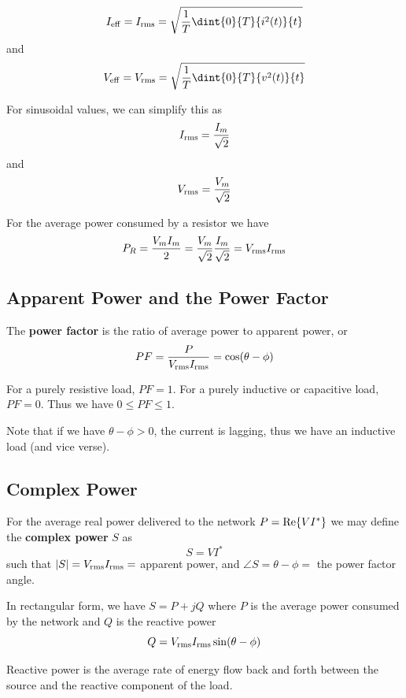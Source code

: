 \documentclass[12pt]{article}
\begin{document}
\[ I_{{\rm eff}} = I_{{\rm rms}} = \sqrt{\frac{1}{T}\dint{0}{T}{i^2(t)}{t}} \] and \[ V_{{\rm eff}} = V_{{\rm rms}} = \sqrt{\frac{1}{T}\dint{0}{T}{v^2(t)}{t}} \]

For sinusoidal values, we can simplify this as \[ I_{{\rm rms}} = \frac{I_m}{\sqrt{2}} \] and \[ V_{{\rm rms}} = \frac{V_m}{\sqrt{2}} \]

For the average power consumed by a resistor we have \[ P_R = \frac{V_mI_m}{2} = \frac{V_m}{\sqrt{2}}\frac{I_m}{\sqrt{2}} = V_{{\rm rms}}I_{{\rm rms}} \]

\subsection*{Apparent Power and the Power Factor}
The {\bf power factor} is the ratio of average power to apparent power, or \[ PF = \frac{P}{V_{{\rm rms}}I_{{\rm rms}}} = \cos(\theta - \phi) \]

For a purely resistive load, $PF = 1$. For a purely inductive or capacitive load, $PF = 0$. Thus we have $0 \leq PF \leq 1$.

Note that if we have $\theta - \phi > 0$, the current is lagging, thus we have an inductive load (and vice verse).

\subsection*{Complex Power}
For the average real power delivered to the network $P = {\rm Re}\{VI^*\}$ we may define the {\bf complex power} $S$ as \[ S = VI^* \] such that $|S| = V_{{\rm rms}}I_{{\rm rms}} =$ apparent power, and $\angle S = \theta - \phi =$ the power factor angle.

In rectangular form, we have $S = P + jQ$ where $P$ is the average power consumed by the network and $Q$ is the reactive power \[ Q = V_{{\rm rms}}I_{{\rm rms}}\sin(\theta - \phi) \]

Reactive power is the average rate of energy flow back and forth between the source and the reactive component of the load.
\end{document}
